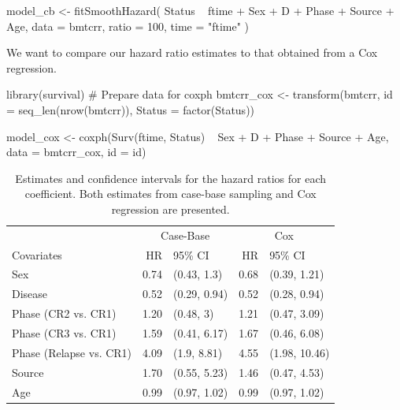 \begin{Schunk}
\begin{Sinput}
model_cb <- fitSmoothHazard(
  Status ~ ftime + Sex + D + Phase + Source + Age,
  data = bmtcrr,
  ratio = 100,
  time = "ftime"
)
\end{Sinput}
\end{Schunk}

We want to compare our hazard ratio estimates to that obtained from a
Cox regression.

\begin{Schunk}
\begin{Sinput}
library(survival)
# Prepare data for coxph
bmtcrr_cox <- transform(bmtcrr, 
                        id = seq_len(nrow(bmtcrr)),
                        Status = factor(Status))

model_cox <- coxph(Surv(ftime, Status) ~ Sex + D + Phase + Source + Age,
                   data = bmtcrr_cox, id = id)
\end{Sinput}
\end{Schunk}

\begin{Schunk}
\begin{table}

\caption{\label{tab:bmtcrr-cis}Estimates and confidence intervals for the hazard ratios for each coefficient. Both estimates from case-base sampling and Cox regression are presented.}
\centering
\begin{tabular}[t]{lrlrl}
\toprule
\multicolumn{1}{c}{ } & \multicolumn{2}{c}{Case-Base} & \multicolumn{2}{c}{Cox} \\
\cmidrule(l{3pt}r{3pt}){2-3} \cmidrule(l{3pt}r{3pt}){4-5}
Covariates & HR & 95\% CI & HR & 95\% CI\\
\midrule
Sex & 0.74 & (0.43, 1.3) & 0.68 & (0.39, 1.21)\\
Disease & 0.52 & (0.29, 0.94) & 0.52 & (0.28, 0.94)\\
Phase (CR2 vs. CR1) & 1.20 & (0.48, 3) & 1.21 & (0.47, 3.09)\\
Phase (CR3 vs. CR1) & 1.59 & (0.41, 6.17) & 1.67 & (0.46, 6.08)\\
Phase (Relapse vs. CR1) & 4.09 & (1.9, 8.81) & 4.55 & (1.98, 10.46)\\
\addlinespace
Source & 1.70 & (0.55, 5.23) & 1.46 & (0.47, 4.53)\\
Age & 0.99 & (0.97, 1.02) & 0.99 & (0.97, 1.02)\\
\bottomrule
\end{tabular}
\end{table}

\end{Schunk}

